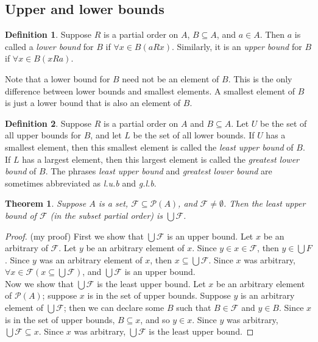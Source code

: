 \documentclass{report}
\newtheorem*{theorem}{Theorem}
\theoremstyle{definition}
\newtheorem*{definition}{Definition}
\begin{document}
\subsection{Upper and lower bounds}
\begin{definition}
Suppose $R$ is a partial order on $A$, $B\subseteq A$, and $a\in A$. Then $a$ is called a \textit{lower bound} for $B$ if $\forall x\in B(aRx)$. Similarly, it is an \textit{upper bound} for $B$ if
$\forall x\in B(xRa)$.
\end{definition}
\noindent Note that a lower bound for $B$ need not be an element of $B$. This is the only difference between lower bounds and smallest elements. A smallest element of $B$ is just a lower bound that
is also an element of $B$.
\begin{definition}
Suppose $R$ is a partial order on $A$ and $B\subseteq A$. Let $U$ be the set of all upper bounds for $B$, and let $L$ be the set of all lower bounds. If $U$ has a smallest element, then
this smallest element is called the \textit{least upper bound} of $B$. If $L$ has a largest element, then this largest element is called the \textit{greatest lower bound} of $B$. The phrases
\textit{least upper bound} and \textit{greatest lower bound} are sometimes abbreviated as
\textit{l.u.b} and \textit{g.l.b}.
\end{definition}
\begin{theorem}
Suppose $A$ is a set, $\mathcal F\subseteq\mathscr P(A)$, and $\mathcal F\neq\emptyset$. Then the least upper bound of $\mathcal F$ (in the subset partial order) is $\bigcup\mathcal F$.
\end{theorem}
\begin{proof}
(my proof) First we show that $\bigcup\mathcal F$ is an upper bound. Let $x$ be an arbitrary of $\mathcal F$. Let $y$ be an arbitrary element of $x$. Since $y\in x\in \mathcal F$, then 
$y\in\bigcup F$. Since $y$ was an arbitrary element of $x$, then $x\subseteq\bigcup\mathcal F$. Since $x$ was arbitrary, $\forall x\in\mathcal F(x\subseteq\bigcup\mathcal F)$, and 
$\bigcup\mathcal F$ is an upper bound.\\
\indent Now we show that $\bigcup\mathcal F$ is the least upper bound. Let $x$ be an arbitrary element of $\mathscr P(A)$; suppose $x$ is in the set of upper bounds. Suppose $y$ is an arbitrary 
element of $\bigcup\mathcal F$; then we can declare some $B$ such that $B\in\mathcal F$ and $y\in B$. Since $x$ is in the set of upper bounds, $B\subseteq x$, and so $y\in x$. Since $y$ was 
arbitrary, $\bigcup\mathcal F\subseteq x$. Since $x$ was arbitrary, $\bigcup\mathcal F$ is the least upper bound.
\end{proof}
\end{document}
